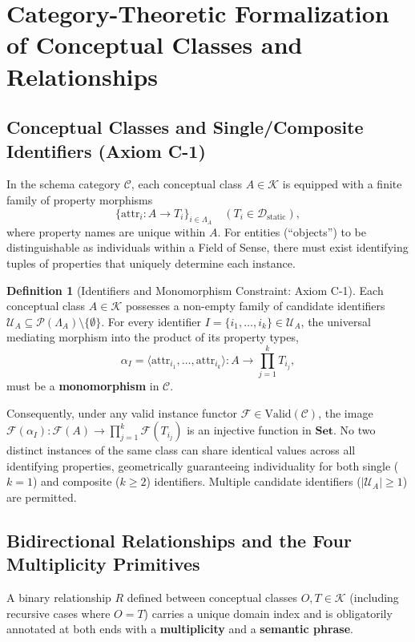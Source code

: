 \documentclass[11pt,a4paper]{article}
\theoremstyle{definition}
\newtheorem{definition}{Definition}[section]
\theoremstyle{plain}
\theoremstyle{remark}
\newcommand{\Valid}{\mathrm{Valid}}
\newcommand{\Set}{\mathbf{Set}}
\newcommand{\Dstatic}{\mathcal{D}_{\mathrm{static}}}
\begin{document}
\section{Category-Theoretic Formalization of Conceptual Classes and Relationships}

\subsection{Conceptual Classes and Single/Composite Identifiers (Axiom C-1)}
In the schema category $\mathcal{C}$, each conceptual class $A \in \mathcal{K}$ is equipped with a finite family of property morphisms
\begin{equation}
\{\mathrm{attr}_i : A \to T_i\}_{i \in \Lambda_A} \quad (T_i \in \Dstatic),
\end{equation}
where property names are unique within $A$. For entities (``objects'') to be distinguishable as individuals within a Field of Sense, there must exist identifying tuples of properties that uniquely determine each instance.

\begin{definition}[Identifiers and Monomorphism Constraint: Axiom C-1]\label{def:identifier}
Each conceptual class $A \in \mathcal{K}$ possesses a non-empty family of candidate identifiers $\mathcal{U}_A \subseteq \mathcal{P}(\Lambda_A) \setminus \{\emptyset\}$. For every identifier $I = \{i_1, \dots, i_k\} \in \mathcal{U}_A$, the universal mediating morphism into the product of its property types,
\begin{equation}
\alpha_I = \langle \mathrm{attr}_{i_1}, \dots, \mathrm{attr}_{i_k} \rangle : A \longrightarrow \prod_{j=1}^k T_{i_j},
\end{equation}
must be a \textbf{monomorphism} in $\mathcal{C}$.
\end{definition}

Consequently, under any valid instance functor $\mathcal{F} \in \Valid(\mathcal{C})$, the image $\mathcal{F}(\alpha_I) : \mathcal{F}(A) \to \prod_{j=1}^k \mathcal{F}(T_{i_j})$ is an injective function in $\Set$. No two distinct instances of the same class can share identical values across all identifying properties, geometrically guaranteeing individuality for both single ($k=1$) and composite ($k \ge 2$) identifiers. Multiple candidate identifiers ($\lvert \mathcal{U}_A \rvert \ge 1$) are permitted.

\subsection{Bidirectional Relationships and the Four Multiplicity Primitives}
A binary relationship $R$ defined between conceptual classes $O, T \in \mathcal{K}$ (including recursive cases where $O = T$) carries a unique domain index and is obligatorily annotated at both ends with a \textbf{multiplicity} and a \textbf{semantic phrase}.
\end{document}
